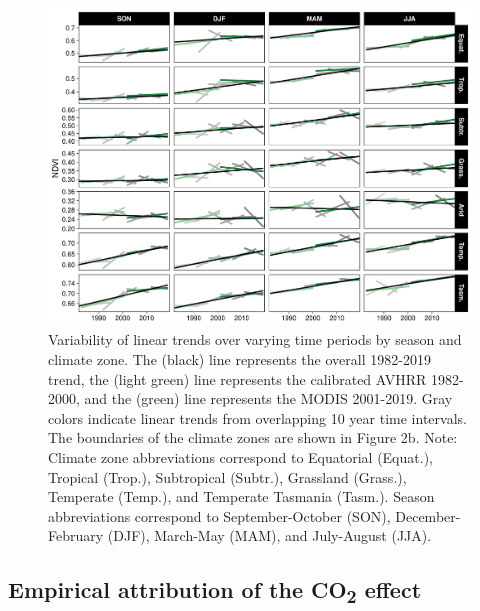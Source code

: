 \documentclass[gc, manuscript]{copernicus}
\begin{document}
\begin{figure}
\includegraphics[width=14cm]{../../figures/Fig4_ndvi_lin_rlm_trend_10yr_segs_by_Koppen} \caption{Variability of linear trends over varying time periods by season and climate zone. The (black) line represents the overall 1982-2019 trend, the (light green) line represents the calibrated AVHRR 1982-2000, and the (green) line represents the MODIS 2001-2019. Gray colors indicate linear trends from overlapping 10 year time intervals. The boundaries of the climate zones are shown in Figure 2b. \linebreak Note: Climate zone abbreviations correspond to Equatorial (Equat.), Tropical (Trop.), Subtropical (Subtr.), Grassland (Grass.), Temperate (Temp.), and Temperate Tasmania (Tasm.). Season abbreviations correspond to September-October (SON), December-February (DJF), March-May (MAM), and July-August (JJA).}\label{fig:unnamed-chunk-3}
\end{figure}
\clearpage

\subsection{\texorpdfstring{Empirical attribution of the
CO\textsubscript{2} effect}{Empirical attribution of the CO2 effect}}
\end{document}
